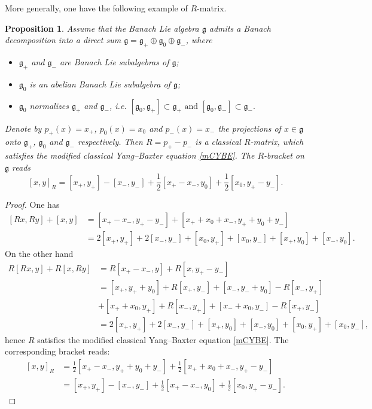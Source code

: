 \documentclass[a4paper,12pt,reqno]{amsart}%
\newtheorem{proposition}[theorem]{Proposition}
\theoremstyle{definition}
\theoremstyle{remark}
\numberwithin{theorem}{section}
\numberwithin{equation}{section}
\newcommand{\1}{{\bf 1}}
\newcommand{\g}{{\mathfrak g}}
\begin{document}
More generally, one have the following example of $R$-matrix.
\begin{proposition}
    Assume that the Banach Lie algebra $\mathfrak{g}$ admits a Banach decomposition into a direct sum $\g = \g_+\oplus \g_0\oplus \g_-$, where
    \begin{itemize}
        \item $\g_+$ and $\g_-$ are Banach Lie subalgebras of $\g$;
        \item $\g_0$ is an abelian Banach Lie subalgebra of $\g$;
        \item $\g_0$ normalizes $\g_+$ and $\g_-$, i.e.
  $  [\g_0, \g_+] \subset \g_+ \textrm{ and } [\g_0, \g_-] \subset \g_-.
        $
    \end{itemize}

Denote by $p_+(x) = x_+$, $p_0(x) = x_0$ and $p_-(x) = x_-$ the projections of $x\in\g$ onto $\g_+$, $\g_0$ and $\g_-$ respectively.
Then $R = p_+ - p_-$ is a classical $R$-matrix, which satisfies the  modified classical Yang–Baxter
equation \eqref{mCYBE}. The $R$-bracket on $\mathfrak{g}$ reads
\begin{equation}\label{R-bracket-proj}
[x, y]_R = [x_+, y_+]  - [x_-, y_-]  +\frac{1}{2}[x_+-x_-, y_0]   +\frac{1}{2}[x_0, y_+-y_-] .
\end{equation}
\end{proposition}
\begin{proof}
    One has
    \[
    \begin{array}{ll}
[Rx, Ry]  + [x, y]  &= [x_+-x_-, y_+-y_-]  + [x_++x_0+ x_-, y_++y_0+y_-] \\ &  = 2[x_+, y_+]  + 2[x_-, y_-]  + [x_0, y_+]  +  [x_0, y_-]  + [x_+, y_0]  + [x_-, y_0] .
\end{array}
    \]
    On the other hand
    \[
    \begin{array}{ll}
R[Rx, y]  + R[x, Ry]  &= R[x_+-x_-, y]  + R[x, y_+-y_-] \\   
& =  [x_+, y_++y_0]  + R[x_+, y_-]  +[x_-, y_- + y_0]  -R[x_-, y_+]  \\
& + [x_+ + x_0, y_+]  + R[x_-, y_+] + [x_-+x_0, y_-] - R[x_+, y_-]\\
& = 2[x_+, y_+]  + 2[x_-, y_-]  +[x_+, y_0]   + [x_-, y_0]  + [x_0, y_+]  +  [x_0, y_-] ,
\end{array}
    \]
    hence $R$ satisfies the  modified classical Yang–Baxter
equation \eqref{mCYBE}. The corresponding bracket reads:
\[
\begin{array}{ll}
[x, y]_R & = \frac{1}{2}[x_+-x_-, y_+ + y_0 + y_-]  + \frac{1}{2}[x_+ + x_0 + x_-, y_+-y_-] \\
& = [x_+, y_+]  - [x_-, y_-]  +\frac{1}{2}[x_+-x_-, y_0]   +\frac{1}{2}[x_0, y_+-y_-] . 
\end{array}
\]
\end{proof}
\end{document}
